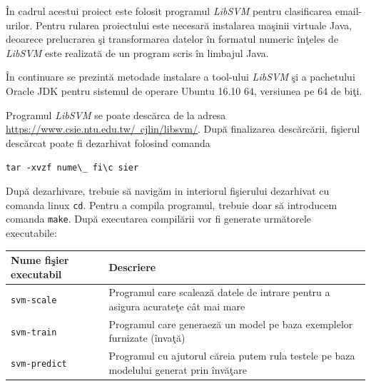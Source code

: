 \documentclass[a4paper,12pt]{report}
\begin{document}
  \par
  \^In cadrul acestui proiect este folosit programul \textit{LibSVM} pentru clasificarea email-urilor. Pentru rularea
  proiectului este necesar\u a instalarea ma\c sinii virtuale Java, deoarece prelucrarea \c si transformarea datelor
  \^in formatul numeric \^in\c teles de \textit{LibSVM} este realizat\u a de un program scris \^in limbajul Java.
  
  \^In continuare se prezint\u a metodade instalare a tool-ului \textit{LibSVM} \c si a pachetului Oracle JDK 
  pentru sistemul de operare Ubuntu 16.10 64, versiunea pe 64 de bi\c ti.
  
  \par
  Programul \textit{LibSVM} se poate desc\u arca de la adresa 
  \href{https://www.csie.ntu.edu.tw/~cjlin/libsvm/}{https://www.csie.ntu.edu.tw/~cjlin/libsvm/}.
  Dup\u a finalizarea desc\u arc\u arii, fi\c sierul desc\u arcat poate fi dezarhivat folosind comanda
  \begin{center}
    \verb|tar -xvzf nume\_ fi\c sier|
  \end{center}

  \par
  Dup\u a dezarhivare, trebuie s\u a navig\u am in interiorul fi\c sierului dezarhivat cu comanda linux 
  \verb|cd|. Pentru a compila programul, trebuie doar s\u a introducem comanda \verb|make|. Dup\u a executarea 
  compil\u arii vor fi generate urm\u atorele executabile:
  
  \begin{center}
    \begin{tabular}{ | l | p{8cm} | }
      \hline
      \textbf{Nume fi\c sier executabil} & \textbf{Descriere} \\
      \hline
      
      \verb|svm-scale| & Programul care scaleaz\u a datele de intrare pentru a asigura acurate\c te c\^at mai mare \\
      \hline
      
      \verb|svm-train| & Programul care generaez\u a un model pe baza exemplelor furnizate (\^inva\c t\u a) \\
      \hline
      
      \verb|svm-predict| & Programul cu ajutorul c\u areia putem rula testele pe baza 
	modelului generat prin \^inv\u a\c tare \\
      \hline      
    \end{tabular}
  \end{center}
\end{document}
